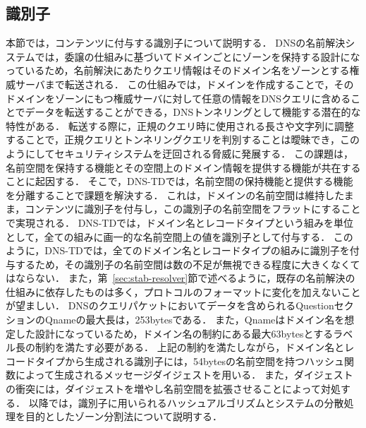 \subsection{識別子}
本節では，コンテンツに付与する識別子について説明する．
DNSの名前解決システムでは，委譲の仕組みに基づいてドメインごとにゾーンを保持する設計になっているため，名前解決にあたりクエリ情報はそのドメイン名をゾーンとする権威サーバまで転送される．
この仕組みでは，ドメインを作成することで，そのドメインをゾーンにもつ権威サーバに対して任意の情報をDNSクエリに含めることでデータを転送することができる，DNSトンネリングとして機能する潜在的な特性がある．
転送する際に，正規のクエリ時に使用される長さや文字列に調整することで，正規クエリとトンネリングクエリを判別することは曖昧でき，このようにしてセキュリティシステムを迂回される脅威に発展する．
この課題は，名前空間を保持する機能とその空間上のドメイン情報を提供する機能が共在することに起因する．
そこで，DNS-TDでは，名前空間の保持機能と提供する機能を分離することで課題を解決する．
これは，ドメインの名前空間は維持したまま，コンテンツに識別子を付与し，この識別子の名前空間をフラットにすることで実現される．
DNS-TDでは，ドメイン名とレコードタイプという組みを単位として，全ての組みに画一的な名前空間上の値を識別子として付与する．
このように，DNS-TDでは，全てのドメイン名とレコードタイプの組みに識別子を付与するため，その識別子の名前空間は数の不足が無視できる程度に大きくなくてはならない．
また，第~\ref{sec:stab-resolver}節で述べるように，既存の名前解決の仕組みに依存したものは多く，プロトコルのフォーマットに変化を加えないことが望ましい．
DNSのクエリパケットにおいてデータを含められるQuestionセクションのQnameの最大長は，253bytesである．
また，Qnameはドメイン名を想定した設計になっているため，ドメイン名の制約にある最大63bytesとするラベル長の制約を満たす必要がある．
上記の制約を満たしながら，ドメイン名とレコードタイプから生成される識別子には，54bytesの名前空間を持つハッシュ関数によって生成されるメッセージダイジェストを用いる．
また，ダイジェストの衝突には，ダイジェストを増やし名前空間を拡張させることによって対処する．
以降では，識別子に用いられるハッシュアルゴリズムとシステムの分散処理を目的としたゾーン分割法について説明する．

